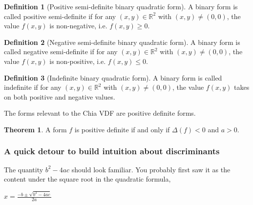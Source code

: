 \documentclass{article}
\theoremstyle{definition}
\newtheorem{definition}{Definition}[section]
\theoremstyle{theorem}
\newtheorem{theorem}{Theorem}[section]
\theoremstyle{example}
\theoremstyle{corollary}
\begin{document}
\bigskip

\theoremstyle{definition}
\begin{definition}[Positive semi-definite binary quadratic form]
A binary form is called positive semi-definite if for any \((x, y) \in \mathbb{R}^{2}\) with \((x, y) \ne (0, 0)\), the value \(f(x, y)\) is non-negative, i.e. \(f(x, y) \ge 0\).
\end{definition}

\bigskip

\theoremstyle{definition}
\begin{definition}[Negative semi-definite binary quadratic form]
A binary form is called negative semi-definite if for any \((x, y) \in \mathbb{R}^{2}\) with \((x, y) \ne (0, 0)\), the value \(f(x, y)\) is non-positive, i.e. \(f(x, y) \le 0\).
\end{definition}

\bigskip

\theoremstyle{definition}
\begin{definition}[Indefinite binary quadratic form]
A binary form is called indefinite if for any \((x, y) \in \mathbb{R}^{2}\) with \((x, y) \ne (0, 0)\), the value \(f(x, y)\) takes on both positive and negative values.
\end{definition}

\bigskip

The forms relevant to the Chia VDF are positive definite forms.

\bigskip

\theoremstyle{theorem}
\begin{theorem}
A form \(f\) is positive definite if and only if \(\Delta(f) < 0\) and \(a > 0\).
\end{theorem}







\bigskip

\subsubsection{A quick detour to build intuition about discriminants}

\bigskip

The quantity \(b^{2} - 4ac\) should look familiar. You probably first saw it as the content under the square root in the quadratic formula,
\begin{center}
\(x = \frac{-b \pm \sqrt{b^{2} - 4ac}}{2a}\)
\end{center}
\end{document}
